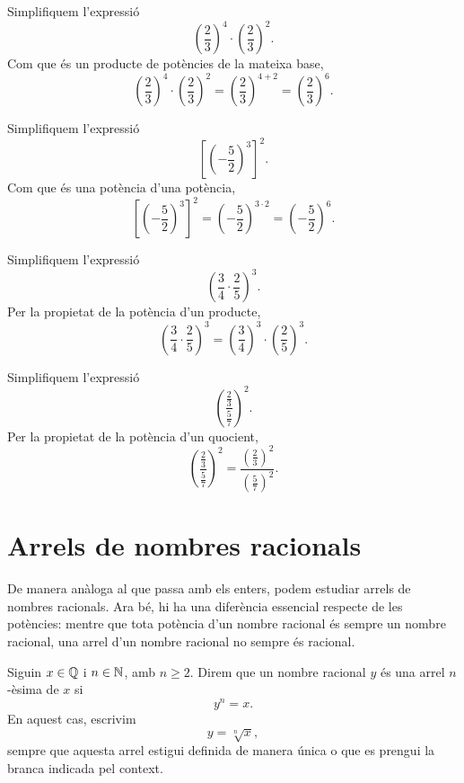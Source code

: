 \begin{exemple}
Simplifiquem l'expressió
\[
	\left(\frac{2}{3}\right)^4
	\cdot
	\left(\frac{2}{3}\right)^2.
\]
Com que és un producte de potències de la mateixa base,
\[
	\left(\frac{2}{3}\right)^4
	\cdot
	\left(\frac{2}{3}\right)^2
	=
	\left(\frac{2}{3}\right)^{4+2}
	=
	\left(\frac{2}{3}\right)^6.
\]
\end{exemple}

\begin{exemple}
Simplifiquem l'expressió
\[
	\left[
		\left(-\frac{5}{2}\right)^3
	\right]^2.
\]
Com que és una potència d'una potència,
\[
	\left[
		\left(-\frac{5}{2}\right)^3
	\right]^2
	=
	\left(-\frac{5}{2}\right)^{3\cdot2}
	=
	\left(-\frac{5}{2}\right)^6.
\]
\end{exemple}

\begin{exemple}
Simplifiquem l'expressió
\[
	\left(\frac{3}{4}\cdot\frac{2}{5}\right)^3.
\]
Per la propietat de la potència d'un producte,
\[
	\left(\frac{3}{4}\cdot\frac{2}{5}\right)^3
	=
	\left(\frac{3}{4}\right)^3
	\cdot
	\left(\frac{2}{5}\right)^3.
\]
\end{exemple}

\begin{exemple}
Simplifiquem l'expressió
\[
	\left(\frac{\frac{2}{3}}{\frac{5}{7}}\right)^2.
\]
Per la propietat de la potència d'un quocient,
\[
	\left(\frac{\frac{2}{3}}{\frac{5}{7}}\right)^2
	=
	\frac{\left(\frac{2}{3}\right)^2}{\left(\frac{5}{7}\right)^2}.
\]
\end{exemple}

\section{Arrels de nombres racionals}

De manera anàloga al que passa amb els enters, podem estudiar arrels de nombres racionals. Ara bé, hi ha una diferència essencial respecte de les potències: mentre que tota potència d'un nombre racional és sempre un nombre racional, una arrel d'un nombre racional no sempre és racional.

\begin{definicio}
Siguin \(x\in\mathbb{Q}\) i \(n\in\mathbb{N}\), amb \(n\geq2\). Direm que un nombre racional \(y\) és una arrel \(n\)-èsima de \(x\) si
\[
	y^n=x.
\]
En aquest cas, escrivim
\[
	y=\sqrt[n]{x},
\]
sempre que aquesta arrel estigui definida de manera única o que es prengui la branca indicada pel context.
\end{definicio}

